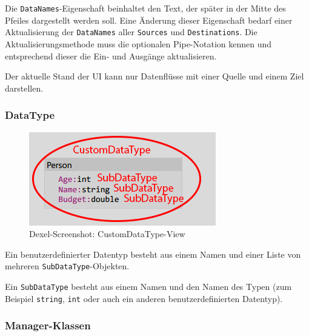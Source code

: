 Die \texttt{DataNames}-Eigenschaft beinhaltet den Text, der später in der Mitte des
Pfeiles dargestellt werden soll. Eine Änderung dieser Eigenschaft bedarf
einer Aktualisierung der \texttt{DataNames} aller \texttt{Sources} und \texttt{Destinations}.
Die Aktualisierungsmethode muss die optionalen Pipe-Notation kennen und
entsprechend dieser die Ein- und Ausgänge aktualisieren.

Der aktuelle Stand der UI kann nur Datenflüsse mit einer Quelle und
einem Ziel darstellen.

\subsubsection{DataType}


\begin{figure}[H]
	\centering
	\includegraphics[width=0.5\linewidth]{./img/CustomDataType.png} 
	\caption{Dexel-Screenshot: CustomDataType-View}
\end{figure}


Ein benutzerdefinierter Datentyp besteht aus einem Namen und einer Liste von mehreren
\texttt{SubDataType}-Objekten. 

Ein \texttt{SubDataType} besteht aus einem Namen und den Namen
des Typen (zum Beispiel \texttt{string}, \texttt{int} oder auch ein anderen benutzerdefinierten Datentyp).

\subsubsection{Manager-Klassen}


